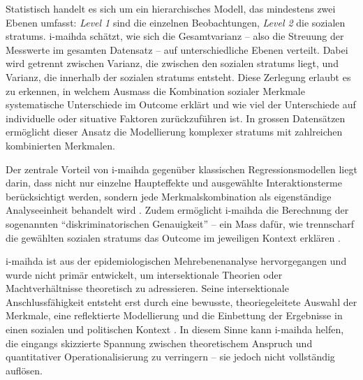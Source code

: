 
Statistisch handelt es sich um ein hierarchisches Modell, das mindestens zwei Ebenen umfasst: \textit{Level 1} sind die einzelnen Beobachtungen, \textit{Level 2} die sozialen \glspl{stratum}. \gls{i-maihda} schätzt, wie sich die Gesamtvarianz -- also die Streuung der Messwerte im gesamten Datensatz -- auf unterschiedliche Ebenen verteilt. Dabei wird getrennt zwischen Varianz, die zwischen den sozialen \glspl{stratum} liegt, und Varianz, die innerhalb der sozialen \glspl{stratum} entsteht. Diese Zerlegung erlaubt es zu erkennen, in welchem Ausmass die Kombination sozialer Merkmale systematische Unterschiede im Outcome erklärt und wie viel der Unterschiede auf individuelle oder situative Faktoren zurückzuführen ist. In grossen Datensätzen ermöglicht dieser Ansatz die Modellierung komplexer \glspl{stratum} mit zahlreichen kombinierten Merkmalen.

Der zentrale Vorteil von \gls{i-maihda} gegenüber klassischen Regressionsmodellen liegt darin, dass nicht nur einzelne Haupteffekte und ausgewählte Interaktionsterme berücksichtigt werden, sondern jede Merkmalskombination als eigenständige Analyseeinheit behandelt wird \parencite{scottIntersectionalityQuantitativeMethods2017,bowlegInvitedReflectionQuantifying2016}. Zudem ermöglicht \gls{i-maihda} die Berechnung der sogenannten \enquote{diskriminatorischen Genauigkeit} -- ein Mass dafür, wie trennscharf die gewählten sozialen \glspl{stratum} das Outcome im jeweiligen Kontext erklären \parencite{evansTutorialConductingIntersectional2024}.

\gls{i-maihda} ist aus der epidemiologischen Mehrebenenanalyse hervorgegangen und wurde nicht primär entwickelt, um intersektionale Theorien oder Machtverhältnisse theoretisch zu adressieren. Seine intersektionale Anschlussfähigkeit entsteht erst durch eine bewusste, theoriegeleitete Auswahl der Merkmale, eine reflektierte Modellierung und die Einbettung der Ergebnisse in einen sozialen und politischen Kontext \parencite{grossModellingIntersectionalityQuantitative2023}. In diesem Sinne kann \gls{i-maihda} helfen, die eingangs skizzierte Spannung zwischen theoretischem Anspruch und quantitativer Operationalisierung zu verringern -- sie jedoch nicht vollständig auflösen.

